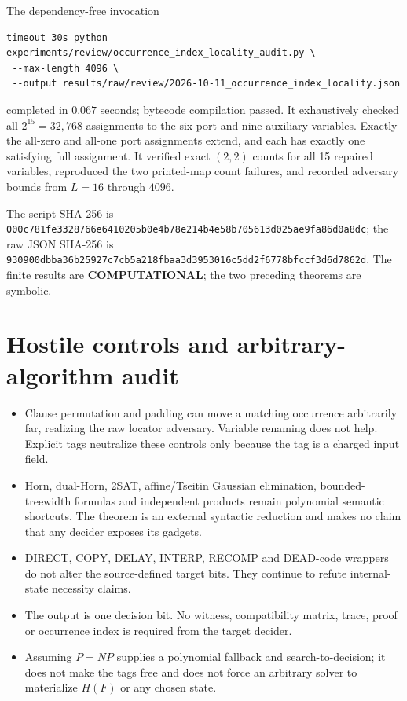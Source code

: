 \documentclass[11pt]{article}
\newcommand{\COMP}{\textbf{COMPUTATIONAL}}
\begin{document}
The dependency-free invocation
\begin{verbatim}
timeout 30s python experiments/review/occurrence_index_locality_audit.py \
 --max-length 4096 \
 --output results/raw/review/2026-10-11_occurrence_index_locality.json
\end{verbatim}
completed in $0.067$ seconds; bytecode compilation passed.  It exhaustively
checked all $2^{15}=32{,}768$ assignments to the six port and nine auxiliary
variables.  Exactly the all-zero and all-one port assignments extend, and
each has exactly one satisfying full assignment.  It verified exact $(2,2)$
counts for all 15 repaired variables, reproduced the two printed-map count
failures, and recorded adversary bounds from $L=16$ through $4096$.

The script SHA-256 is
\nolinkurl{000c781fe3328766e6410205b0e4b78e214b4e58b705613d025ae9fa86d0a8dc};
the raw JSON SHA-256 is
\nolinkurl{930900dbba36b25927c7cb5a218fbaa3d3953016c5dd2f6778bfccf3d6d7862d}.
The finite results are \COMP; the two preceding theorems are symbolic.

\section{Hostile controls and arbitrary-algorithm audit}

\begin{itemize}[leftmargin=*]
\item Clause permutation and padding can move a matching occurrence
arbitrarily far, realizing the raw locator adversary.  Variable renaming does
not help.  Explicit tags neutralize these controls only because the tag is a
charged input field.
\item Horn, dual-Horn, 2SAT, affine/Tseitin Gaussian elimination,
bounded-treewidth formulas and independent products remain polynomial
semantic shortcuts.  The theorem is an external syntactic reduction and
makes no claim that any decider exposes its gadgets.
\item DIRECT, COPY, DELAY, INTERP, RECOMP and DEAD-code wrappers do not alter
the source-defined target bits.  They continue to refute internal-state
necessity claims.
\item The output is one decision bit.  No witness, compatibility matrix,
trace, proof or occurrence index is required from the target decider.
\item Assuming $P=NP$ supplies a polynomial fallback and search-to-decision;
it does not make the tags free and does not force an arbitrary solver to
materialize $H(F)$ or any chosen state.
\end{itemize}
\end{document}

